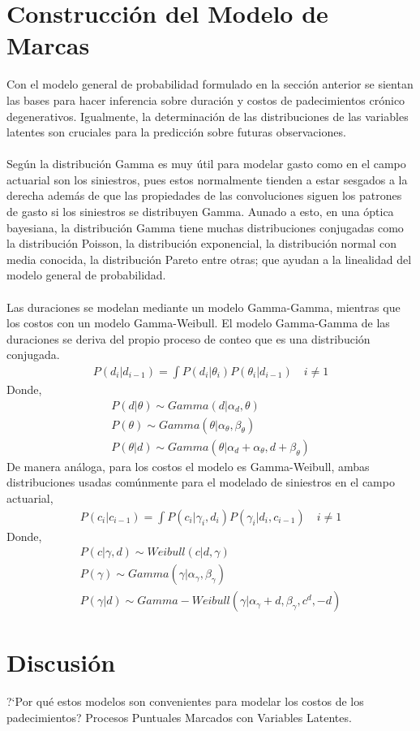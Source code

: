 \section{Construcci\'on del Modelo de Marcas}
Con el modelo general de probabilidad formulado en la secci\'on anterior se sientan las bases para hacer inferencia sobre duraci\'on y costos de padecimientos cr\'onico degenerativos. Igualmente, la determinaci\'on de las distribuciones de las variables latentes son cruciales para la predicci\'on sobre futuras observaciones.\\
\\
Seg\'un \cite{fader2013gamma} la distribuci\'on Gamma es muy \'util para modelar gasto como en el campo actuarial son los siniestros, pues estos normalmente tienden a estar sesgados a la derecha adem\'as de que las propiedades de las convoluciones siguen los patrones de gasto si los siniestros se distribuyen Gamma. Aunado a esto, en una \'optica bayesiana, la distribuci\'on Gamma tiene muchas distribuciones conjugadas como la distribuci\'on Poisson, la distribuci\'on exponencial, la distribuci\'on normal con media conocida, la distribuci\'on Pareto entre otras; que ayudan a la linealidad del modelo general de probabilidad.\\
\\
Las duraciones se modelan mediante un modelo Gamma-Gamma, mientras que los costos con un modelo Gamma-Weibull. El modelo Gamma-Gamma de las duraciones se deriva del propio proceso de conteo que es una distribuci\'on conjugada.
\begin{align*}
P(d_i|d_{i-1})=\int P(d_i|\theta_i) P(\theta_i|d_{i-1}) \quad i \neq 1
\end{align*}
Donde,
\begin{align*}
P(d|\theta) \sim Gamma(d|\alpha_d,\theta)\\
P(\theta) \sim Gamma(\theta|\alpha_{\theta},\beta_\theta)\\
P(\theta|d) \sim Gamma(\theta|\alpha_d+\alpha_\theta, d+\beta_\theta)
\end{align*}
De manera an\'aloga, para los costos el modelo es Gamma-Weibull, ambas distribuciones usadas com\'unmente para el modelado de siniestros en el campo actuarial,
\begin{align*}
P(c_i|c_{i-1})=\int P(c_i|\gamma_i,d_i)P(\gamma_i|d_i,c_{i-1}) \quad i \neq 1
\end{align*}
Donde,
\begin{align*}
P(c|\gamma,d) \sim Weibull(c|d,\gamma)\\
P(\gamma) \sim Gamma(\gamma|\alpha_\gamma,\beta_\gamma)\\
P(\gamma|d) \sim Gamma-Weibull(\gamma|\alpha_\gamma+d,\beta_\gamma,c^d,-d)
\end{align*}
\section{Discusi\'on}
?`Por qu\'e estos modelos son convenientes para modelar los costos de los padecimientos? Procesos Puntuales Marcados con Variables Latentes.